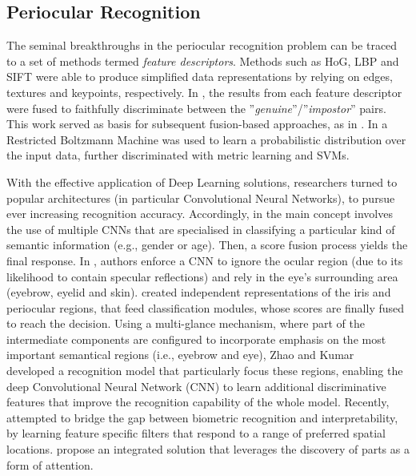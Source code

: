 \documentclass[final]{cvpr}
\begin{document}
\subsection{Periocular Recognition}
\label{subsec:periocular_recognition}
The seminal breakthroughs in the periocular recognition problem can be traced to a set of methods termed \textit{feature descriptors}. Methods such as HoG, LBP and SIFT were able to produce simplified data representations by relying on edges, textures and keypoints, respectively. In \cite{feasibility_study}, the results from each feature descriptor were fused to faithfully discriminate between the ''\emph{genuine}''/''\emph{impostor}'' pairs. This work served as basis for subsequent fusion-based approaches, as in \cite{information_fusion_approach}.  In \cite{rbm_feature_learning} a Restricted Boltzmann Machine was used to learn a probabilistic distribution over the input data, further discriminated with metric learning and SVMs.

With the effective application of Deep Learning solutions, researchers turned to popular architectures (in particular Convolutional Neural Networks), to pursue ever increasing recognition accuracy. Accordingly, in \cite{accurate_periocular_recognition} the main concept involves the use of multiple CNNs that are specialised in classifying a particular kind of semantic information (e.g., gender or age). Then, a score fusion process yields the final response. In \cite{deep_prwis},  authors enforce a CNN to ignore the ocular region (due to its likelihood to contain specular reflections) and rely in the eye's surrounding area (eyebrow, eyelid and skin). \cite{person_identification} created independent representations of the iris and periocular regions, that feed classification modules, whose scores are finally fused to reach the decision. Using a multi-glance mechanism, where part of the intermediate components are configured to incorporate emphasis on the most important semantical regions (i.e., eyebrow and eye), Zhao and Kumar~\cite{zhao_kumar_novel} developed a recognition model that particularly focus these regions, enabling the deep Convolutional Neural Network (CNN) to learn additional discriminative features that improve the recognition capability of the whole model. Recently,  \cite{towards_interpretable_face_recognition} attempted to bridge the gap between biometric recognition and interpretability, by learning feature specific filters that respond to a range of preferred spatial locations. \cite{interpretability_by_parts} propose an integrated solution that leverages the discovery of parts as a form of attention. 
\end{document}
